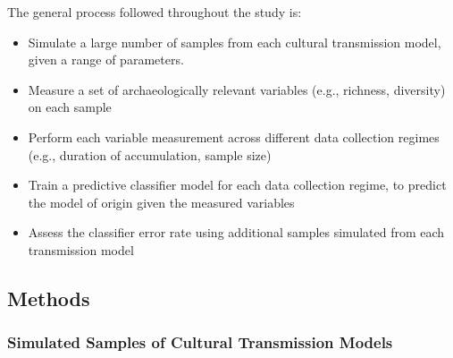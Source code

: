 \documentclass[10pt,letterpaper]{article}
\begin{document}
The general process followed throughout the study is:

\begin{itemize}
\itemsep1pt\parskip0pt
\item
  Simulate a large number of samples from each cultural transmission
  model, given a range of parameters.
\item
  Measure a set of archaeologically relevant variables (e.g., richness,
  diversity) on each sample
\item
  Perform each variable measurement across different data collection
  regimes (e.g., duration of accumulation, sample size)
\item
  Train a predictive classifier model for each data collection regime,
  to predict the model of origin given the measured variables
\item
  Assess the classifier error rate using additional samples simulated
  from each transmission model
\end{itemize}



\subsection{Methods}\label{methods}

\subsubsection{Simulated Samples of Cultural Transmission
Models}\label{simulated-samples-of-cultural-transmission-models}
\end{document}

